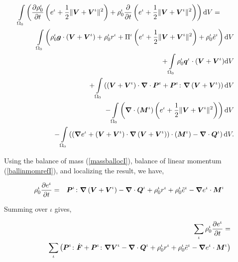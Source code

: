 \begin{eqnarray}
\int\limits_{\Omega_0}\left(\frac{\partial\rho_0^\iota}{\partial
t} \left(e^\iota + \frac{1}{2}\Vert\mbox{\boldmath$ V$}+\mbox{\boldmath$ V$}^\iota\Vert^2 \right) +
\rho^\iota_0\frac{\partial}{\partial t}\left(e^\iota +
\frac{1}{2}\Vert\mbox{\boldmath$ V$}+\mbox{\boldmath$ V$}^\iota\Vert^2 \right)\right) \mathrm{d}V
=\qquad
& &\nonumber\\
 \int\limits_{\Omega_0} \left(\rho_0^\iota\mbox{\boldmath$ g$}
\cdot\left(\mbox{\boldmath$ V$}+\mbox{\boldmath$ V$}^\iota\right) + \rho_0^\iota r^\iota +
\Pi^\iota\left(e^\iota
+ \frac{1}{2}\Vert\mbox{\boldmath$ V$}+\mbox{\boldmath$ V$}^\iota\Vert^2\right)+\rho^\iota_0\tilde{e}^\iota\right)\mathrm{d}V& & \nonumber \\
+\int\limits_{\Omega_0}\rho_0^\iota\mbox{\boldmath$ q$}^\iota\cdot(\mbox{\boldmath$ V$}+\mbox{\boldmath$ V$}^\iota)
\mathrm{d}V&
&\nonumber\\
+\int\limits_{\Omega_0}\left(\left(\mbox{\boldmath$ V$}+\mbox{\boldmath$ V$}^\iota\right)\cdot\mbox{\boldmath$\nabla$}\cdot\mbox{\boldmath$ P$}^\iota
+
\mbox{\boldmath$ P$}^\iota\colon\mbox{\boldmath$\nabla$}\left(\mbox{\boldmath$ V$}+\mbox{\boldmath$ V$}^\iota\right)\right)\mathrm{d}V& &\nonumber\\
-
\int\limits_{\Omega_0}\left(\mbox{\boldmath$\nabla$}\cdot\left(\mbox{\boldmath$ M$}^\iota\right)\left(e^\iota
+\frac{1}{2} \Vert\mbox{\boldmath$ V$}+\mbox{\boldmath$ V$}^\iota\Vert^2\right)\right)\mathrm{d}V & &\nonumber\\
-\int\limits_{\Omega_0}\left( \left(\mbox{\boldmath$\nabla$} e^\iota+
\left(\mbox{\boldmath$ V$}+\mbox{\boldmath$ V$}^\iota\right)\cdot\mbox{\boldmath$\nabla$}\left(\mbox{\boldmath$ V$}+\mbox{\boldmath$ V$}^\iota\right)\right)\cdot\left(\mbox{\boldmath$ M$}^\iota\right)
- \mbox{\boldmath$\nabla$}\cdot\mbox{\boldmath$ Q$}^\iota\right)\mathrm{d}V.
\end{eqnarray}

\noindent Using the balance of mass (\ref{massballocI}), balance
of linear momentum (\ref{ballinmomrefI}), and localizing the
result, we have,

\begin{eqnarray}
\rho^\iota_0\frac{\partial e^\iota}{\partial t} &=&
\mbox{\boldmath$ P$}^\iota\colon\mbox{\boldmath$\nabla$}\left(\mbox{\boldmath$ V$}+\mbox{\boldmath$ V$}^\iota\right)-
\mbox{\boldmath$\nabla$}\cdot\mbox{\boldmath$ Q$}^\iota + \rho_0^\iota r^\iota
+\rho^\iota_0\tilde{e}^\iota - \mbox{\boldmath$\nabla$} e^\iota\cdot\mbox{\boldmath$ M$}^\iota
\label{energybalI}
\end{eqnarray}

\noindent Summing over $\iota$ gives,

\begin{eqnarray}
& &\sum\limits_{\iota}\rho^\iota_0\frac{\partial e^\iota}{\partial
t} =\nonumber\\
& &\qquad\sum\limits_{\iota}\left(
\mbox{\boldmath$ P$}^\iota\colon\dot{\mbox{\boldmath$ F$}}+\mbox{\boldmath$ P$}^\iota\colon\mbox{\boldmath$\nabla$}\mbox{\boldmath$ V$}^\iota -
\mbox{\boldmath$\nabla$}\cdot\mbox{\boldmath$ Q$}^\iota +\rho_0^\iota r^\iota +
\rho^\iota_0\tilde{e}^\iota - \mbox{\boldmath$\nabla$} e^\iota\cdot\mbox{\boldmath$ M$}^\iota\right)
\label{energybaltot}
\end{eqnarray}

